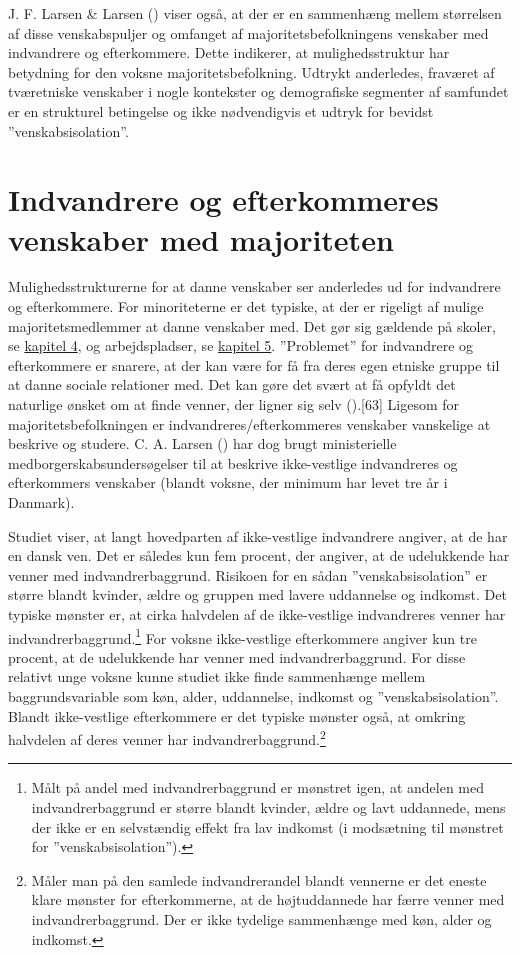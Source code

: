 \documentclass[
]{book}
\begin{document}
J. F. Larsen \& Larsen () viser også, at der er en sammenhæng mellem størrelsen af disse venskabspuljer og omfanget af majoritetsbefolkningens venskaber med indvandrere og efterkommere. Dette indikerer, at mulighedsstruktur har betydning for den voksne majoritetsbefolkning. Udtrykt anderledes, fraværet af tværetniske venskaber i nogle kontekster og demografiske segmenter af samfundet er en strukturel betingelse og ikke nødvendigvis et udtryk for bevidst ''venskabsisolation''.

\section{Indvandrere og efterkommeres venskaber med majoriteten}\label{indvandrere-og-efterkommeres-venskaber-med-majoriteten}

Mulighedsstrukturerne for at danne venskaber ser anderledes ud for indvandrere og efterkommere. For minoriteterne er det typiske, at der er rigeligt af mulige majoritetsmedlemmer at danne venskaber med. Det gør sig gældende på skoler, se \hyperref[kap4]{kapitel 4}, og arbejdspladser, se \hyperref[kap5]{kapitel 5}. ''Problemet'' for indvandrere og efterkommere er snarere, at der kan være for få fra deres egen etniske gruppe til at danne sociale relationer med. Det kan gøre det svært at få opfyldt det naturlige ønsket om at finde venner, der ligner sig selv ().{[}63{]} Ligesom for majoritetsbefolkningen er indvandreres/efterkommeres venskaber vanskelige at beskrive og studere. C. A. Larsen () har dog brugt ministerielle medborgerskabsundersøgelser til at beskrive ikke-vestlige indvandreres og efterkommers venskaber (blandt voksne, der minimum har levet tre år i Danmark).

Studiet viser, at langt hovedparten af ikke-vestlige indvandrere angiver, at de har en dansk ven. Det er således kun fem procent, der angiver, at de udelukkende har venner med indvandrerbaggrund. Risikoen for en sådan ''venskabsisolation'' er større blandt kvinder, ældre og gruppen med lavere uddannelse og indkomst. Det typiske mønster er, at cirka halvdelen af de ikke-vestlige indvandreres venner har indvandrerbaggrund.\footnote{Målt på andel med indvandrerbaggrund er mønstret igen, at andelen med indvandrerbaggrund er større blandt kvinder, ældre og lavt uddannede, mens der ikke er en selvstændig effekt fra lav indkomst (i modsætning til mønstret for ''venskabsisolation'').} For voksne ikke-vestlige efterkommere angiver kun tre procent, at de udelukkende har venner med indvandrerbaggrund. For disse relativt unge voksne kunne studiet ikke finde sammenhænge mellem baggrundsvariable som køn, alder, uddannelse, indkomst og ''venskabsisolation''. Blandt ikke-vestlige efterkommere er det typiske mønster også, at omkring halvdelen af deres venner har indvandrerbaggrund.\footnote{Måler man på den samlede indvandrerandel blandt vennerne er det eneste klare mønster for efterkommerne, at de højtuddannede har færre venner med indvandrerbaggrund. Der er ikke tydelige sammenhænge med køn, alder og indkomst.}
\end{document}
